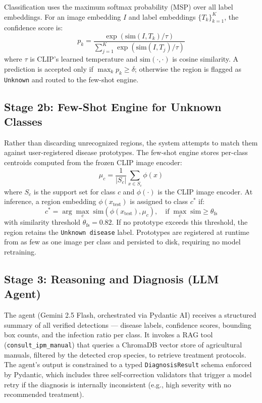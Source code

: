 \documentclass[runningheads]{llncs}
\begin{document}
Classification uses the maximum softmax probability (MSP) over all label embeddings. For an image embedding $I$ and label embeddings $\{T_k\}_{k=1}^{K}$, the confidence score is:
\begin{equation}
    p_k = \frac{\exp(\text{sim}(I, T_k)/\tau)}{\sum_{j=1}^{K} \exp(\text{sim}(I, T_j)/\tau)}
    \label{eq:clip_softmax}
\end{equation}
where $\tau$ is CLIP's learned temperature and $\text{sim}(\cdot,\cdot)$ is cosine similarity. A prediction is accepted only if $\max_k p_k \geq \delta$; otherwise the region is flagged as \texttt{Unknown} and routed to the few-shot engine.

\subsection{Stage 2b: Few-Shot Engine for Unknown Classes}
\label{subsec:fewshot}

Rather than discarding unrecognized regions, the system attempts to match them against user-registered disease prototypes. The few-shot engine stores per-class centroids computed from the frozen CLIP image encoder:
\begin{equation}
    \mu_c = \frac{1}{|S_c|} \sum_{x \in S_c} \phi(x)
\end{equation}
where $S_c$ is the support set for class $c$ and $\phi(\cdot)$ is the CLIP image encoder. At inference, a region embedding $\phi(x_{\text{test}})$ is assigned to class $c^*$ if:
\begin{equation}
    c^* = \arg\max_c \; \text{sim}(\phi(x_{\text{test}}), \mu_c), \quad \text{if} \; \max_c \; \text{sim} \geq \theta_{\text{fs}}
\end{equation}
with similarity threshold $\theta_{\text{fs}} = 0.82$. If no prototype exceeds this threshold, the region retains the \texttt{Unknown disease} label. Prototypes are registered at runtime from as few as one image per class and persisted to disk, requiring no model retraining.

\subsection{Stage 3: Reasoning and Diagnosis (LLM Agent)}
\label{subsec:agent}

The agent (Gemini 2.5 Flash, orchestrated via Pydantic AI) receives a structured summary of all verified detections --- disease labels, confidence scores, bounding box counts, and the infection ratio per class. It invokes a RAG tool (\texttt{consult\_ipm\_manual}) that queries a ChromaDB vector store of agricultural manuals, filtered by the detected crop species, to retrieve treatment protocols. The agent's output is constrained to a typed \texttt{DiagnosisResult} schema enforced by Pydantic, which includes three self-correction validators that trigger a model retry if the diagnosis is internally inconsistent (e.g., high severity with no recommended treatment).
\end{document}
